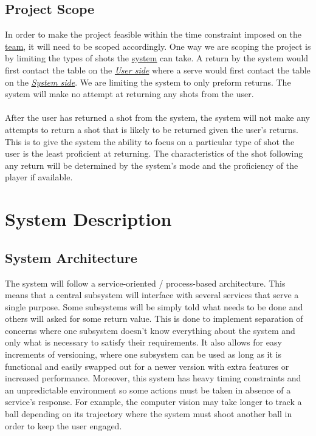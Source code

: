 \documentclass[11pt]{article}
\begin{document}
\subsection{Project Scope}
In order to make the project feasible within the time constraint imposed on the \hyperref[sec:definitions]{team}, it will need to be scoped accordingly. One way we are scoping the project is by limiting the types of shots the \hyperref[sec:definitions]{system} can take. A return by the system would first contact the table on the \hyperref[sec:definitions]{\textit{User side}} where a serve would first contact the table on the \hyperref[sec:definitions]{\textit{System side}}. We are limiting the system to only preform returns. The system will make no attempt at returning any shots from the user. \\\\
After the user has returned a shot from the system, the system will not make any attempts to return a shot that is likely to be returned given the user's returns. This is to give the system the ability to focus on a particular type of shot the user is the least proficient at returning. The characteristics of the shot following any return will be determined by the system's mode and the proficiency of the player if available.
\section{System Description}
\subsection{System Architecture}
The system will follow a service-oriented / process-based architecture. This means that a central subsystem will interface with several services that serve a single purpose. Some subsystems will be simply told what needs to be done and others will asked for some return value. This is done to implement separation of concerns where one subsystem doesn't know everything about the system and only what is necessary to satisfy their requirements. It also allows for easy increments of versioning, where one subsystem can be used as long as it is functional and easily swapped out for a newer version with extra features or increased performance. Moreover, this system has heavy timing constraints and an unpredictable environment so some actions must be taken in absence of a service's response. For example, the computer vision may take longer to track a ball depending on its trajectory where the system must shoot another ball in order to keep the user engaged.
\end{document}
